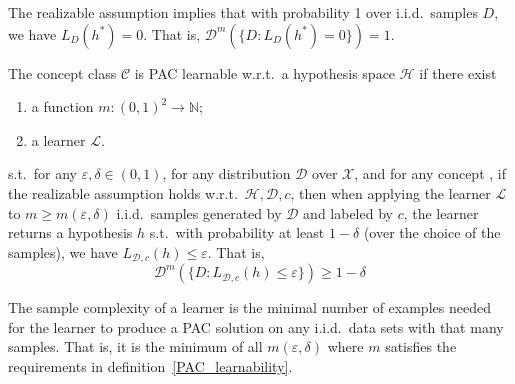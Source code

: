 \begin{re}
    The realizable assumption implies that with probability 1 over i.i.d.\ samples $D$, we have $L_D(h^*) = 0$.
    That is, $\mathcal{D}^m(\{D: L_D(h^*) = 0\}) = 1$.
\end{re}

\begin{df}\label{PAC_learnability}
    The concept class $\mathcal{C}$ is PAC learnable w.r.t.\ a hypothesis space $\mathcal{H}$ if there exist
    \begin{enumerate}
        \item a function $m: {(0, 1)}^2 \longrightarrow \mathbb{N}$;
        \item a learner $\mathcal{L}$.
    \end{enumerate}
    s.t.\ for any $\varepsilon, \delta \in (0, 1)$, for any distribution $\mathcal{D}$ over $\mathcal{X}$, and
    for any concept , if the realizable assumption holds w.r.t.\ $\mathcal{H}, \mathcal{D}, c$, then
    when applying the learner $\mathcal{L}$ to $m \geq m(\varepsilon, \delta)$ i.i.d.\ samples generated by
    $\mathcal{D}$ and labeled by $c$, the learner returns a hypothesis $h$ s.t.\ with probability at least 
    $1 - \delta$ (over the choice of the samples), we have $L_{\mathcal{D},c}(h) \leq \varepsilon$. That is,
    $$\mathcal{D}^m(\{D: L_{\mathcal{D},c}(h) \leq \varepsilon\}) \geq 1 - \delta$$
\end{df}

\begin{df}
    The sample complexity of a learn\-er is the minimal number of examples needed for the learner to produce a 
    PAC solution on any i.i.d.\ data sets with that many samples. That is, it is the minimum of all 
    $m(\varepsilon, \delta)$ where $m$ satisfies the requirements in definition~\ref{PAC_learnability}.
\end{df}

